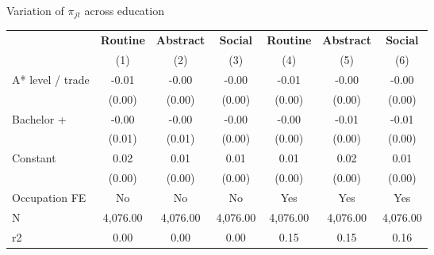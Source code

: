 \begin{center}
\begin{threeparttable}[!h]
\caption{Variation of $\pi_{jt}$ across education}
\begin{tabular}{lcccccc}
\toprule
\toprule
&\multicolumn{1}{c}{\textbf{Routine}}&\multicolumn{1}{c}{\textbf{Abstract}}&\multicolumn{1}{c}{\textbf{Social}}&\multicolumn{1}{c}{\textbf{Routine}}&\multicolumn{1}{c}{\textbf{Abstract}}&\multicolumn{1}{c}{\textbf{Social}} \\
\textbf{}&\multicolumn{1}{c}{(1)}&\multicolumn{1}{c}{(2)}&\multicolumn{1}{c}{(3)}&\multicolumn{1}{c}{(4)}&\multicolumn{1}{c}{(5)}&\multicolumn{1}{c}{(6)} \\
\midrule
A* level / trade    &       -0.01&       -0.00&       -0.00&       -0.01&       -0.00&       -0.00\\
                    &      (0.00)&      (0.00)&      (0.00)&      (0.00)&      (0.00)&      (0.00)\\
Bachelor +          &       -0.00&       -0.00&       -0.00&       -0.00&       -0.01&       -0.01\\
                    &      (0.01)&      (0.01)&      (0.00)&      (0.00)&      (0.00)&      (0.00)\\
Constant            &        0.02&        0.01&        0.01&        0.01&        0.02&        0.01\\
                    &      (0.00)&      (0.00)&      (0.00)&      (0.00)&      (0.00)&      (0.00)\\
Occupation FE       &          No&          No&          No&         Yes&         Yes&         Yes\\
N                   &    4,076.00&    4,076.00&    4,076.00&    4,076.00&    4,076.00&    4,076.00\\
r2                  &        0.00&        0.00&        0.00&        0.15&        0.15&        0.16\\
\bottomrule
\bottomrule
\end{tabular}
\end{threeparttable}
\end{center}
